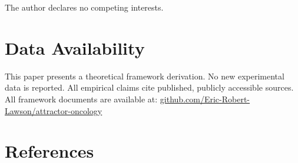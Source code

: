 \documentclass[12pt,a4paper]{article}
\begin{document}
The author declares no competing interests.

\section*{Data Availability}

This paper presents a theoretical framework derivation. No new experimental
data is reported. All empirical claims cite published, publicly accessible
sources. All framework documents are available at:
\href{https://github.com/Eric-Robert-Lawson/attractor-oncology}{github.com/Eric-Robert-Lawson/attractor-oncology}

\section*{References}
\end{document}
